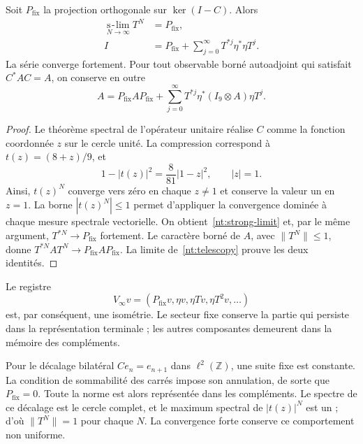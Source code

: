 \begin{theorem}
Soit \(P_{\mathrm{fix}}\) la projection orthogonale sur
\(\ker(I-C)\). Alors
\begin{align}
 \operatorname*{s\!-\!lim}_{N\to\infty}T^N
   &=P_{\mathrm{fix}},\label{nt:strong-limit}\\
 I&=P_{\mathrm{fix}}+
 \sum_{j=0}^{\infty}T^{*j}\eta^*\eta T^j.\label{nt:infinite-record}
\end{align}
La série converge fortement. Pour tout observable borné
autoadjoint qui satisfait \(C^*AC=A\), on conserve en outre
\begin{equation}
 A=P_{\mathrm{fix}}AP_{\mathrm{fix}}+
 \sum_{j=0}^{\infty}
 T^{*j}\eta^*(I_9\otimes A)\eta T^j.
 \label{nt:infinite-observable}
\end{equation}
\end{theorem}

\begin{proof}
Le théorème spectral de l’opérateur unitaire réalise \(C\) comme
la fonction coordonnée \(z\) sur le cercle unité.
La compression correspond à \(t(z)=(8+z)/9\), et
\begin{equation}
 1-|t(z)|^2=\frac8{81}|1-z|^2,
 \qquad |z|=1.
 \label{nt:circular-defect}
\end{equation}
Ainsi, \(t(z)^N\) converge vers zéro en chaque \(z\ne1\) et conserve
la valeur un en \(z=1\). La borne \(|t(z)^N|\leq1\) permet
d’appliquer la convergence dominée à chaque mesure spectrale vectorielle.
On obtient~\eqref{nt:strong-limit} et, par le même argument,
\(T^{*N}\to P_{\mathrm{fix}}\) fortement. Le caractère borné de
\(A\), avec \(\|T^N\|\leq1\), donne
\(T^{*N}AT^N\to P_{\mathrm{fix}}AP_{\mathrm{fix}}\).
La limite de~\eqref{nt:telescopy} prouve les deux identités.
\end{proof}

Le registre
\[
 V_\infty v=(P_{\mathrm{fix}}v,\eta v,\eta Tv,\eta T^2v,\ldots)
\]
est, par conséquent, une isométrie. Le secteur fixe conserve la partie qui persiste dans la représentation terminale ; les autres composantes demeurent dans la mémoire des compléments.

Pour le décalage bilatéral
\(C e_n=e_{n+1}\) dans \(\ell^2(\mathbb Z)\), une suite fixe
est constante. La condition de sommabilité des carrés impose son
annulation, de sorte que \(P_{\mathrm{fix}}=0\). Toute la norme
est alors représentée dans les compléments. Le spectre de
ce décalage est le cercle complet, et le maximum
spectral de \(|t(z)|^N\) est un ; d’où
\(\|T^N\|=1\) pour chaque \(N\). La convergence forte conserve
ce comportement non uniforme.

